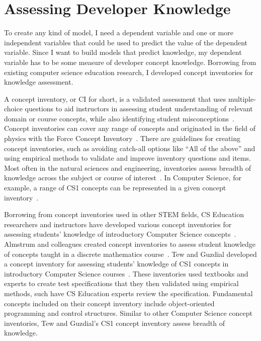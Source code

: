 \chapter{Assessing Developer Knowledge}
\label{chap:assess}

To create any kind of model, I need a dependent variable and one or more independent variables that could be used to predict the value of the dependent variable. Since I want to build models that predict knowledge, my dependent variable has to be some measure of developer concept knowledge.
Borrowing from existing computer science education research, I developed concept inventories for knowledge assessment. 

A concept inventory, or CI for short, is a validated assessment that uses multiple-choice questions to aid instructors in assessing student understanding of relevant domain or course concepts, while also identifying student misconceptions~\cite{evans2003progress}. Concept inventories can cover any range of concepts and originated in the field of physics with the Force Concept Inventory~\cite{hestenes1992force}. There are guidelines for creating concept inventories, such as avoiding catch-all options like ``All of the above'' and using empirical methods to validate and improve inventory questions and items. Most often in the natural sciences and engineering, inventories assess breadth of knowledge across the subject or course of interest~\cite{evans2003progress}. In Computer Science, for example, a range of CS1 concepts can be represented in a given concept inventory~\cite{tew2010developing}.

Borrowing from concept inventories used in other STEM fields, CS Education researchers and instructors have developed various concept inventories for assessing students' knowledge of introductory Computer Science concepts~\cite{almstrum2006concept, krone2010reasoning,tew2010assessing}. Almstrum and colleagues created concept inventories to assess student knowledge of concepts taught in a discrete mathematics course~\cite{almstrum2006concept}. 
Tew and Guzdial developed a concept inventory for assessing students' knowledge of CS1 concepts in introductory Computer Science courses~\cite{tew2010assessing, tew2010developing}. These inventories used textbooks and experts to create test specifications that they then validated using empirical methods, such have CS Education experts review the specification. Fundamental concepts included on their concept inventory include object-oriented programming and control structures. Similar to other Computer Science concept inventories, Tew and Guzdial's CS1 concept inventory assess breadth of knowledge. 
	
